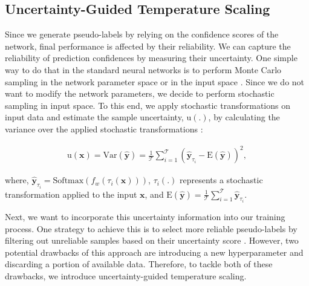 \documentclass[runningheads]{eccv2022submission}
\begin{document}
\subsection{Uncertainty-Guided Temperature Scaling}
\label{sec:uncr-temp}
Since we generate pseudo-labels by relying on the confidence scores of the network, final performance is affected by their reliability. We can capture the reliability of prediction confidences by measuring their uncertainty. One simple way to do that in the standard neural networks is to perform Monte Carlo sampling in the network parameter space \cite{gal2016dropout} or in the input space \cite{ayhan2018,rizve2021in}. Since we do not want to modify the network parameters, we decide to perform stochastic sampling in input space. To this end, we apply stochastic transformations on input data  and estimate the sample uncertainty, $\mathrm{u}(.)$, by calculating the variance over the applied stochastic transformations \cite{feinman2017detecting,NEURIPS2020_f23d125d,rizve2021in}:


\setlength{\abovedisplayskip}{-6pt}
\setlength{\belowdisplayskip}{2pt}
\setlength{\abovedisplayshortskip}{0pt}
\setlength{\belowdisplayshortskip}{0pt}

\begin{align}
\label{eqn:var}
    \mathrm{u}({\mathbf{x}})=\mathrm{Var}(\mathbf{\hat{y}}) = \frac{1}{\mathcal{T}}\sum_{i=1}^\mathcal{T}(\mathbf{\hat{y}}_{\tau_i}-\mathrm{E}(\mathbf{\hat{y}}))^2,
\end{align}

\noindent where, $\mathbf{\hat{y}}_{\tau_i} = \mathrm{Softmax}(f_w(\tau_i(\mathbf{x})))$, $\tau_i(.)$ represents a stochastic transformation applied to the input $\mathbf{x}$, and $\mathrm{E}(\mathbf{\hat{y}})=\frac{1}{\mathcal{T}}\sum_{i=1}^\mathcal{T}\mathbf{\hat{y}}_{\tau_i}$.


Next, we want to incorporate this uncertainty information into our training process. One strategy to achieve this is to select more reliable pseudo-labels by filtering out unreliable samples based on their uncertainty score \cite{rizve2021in}. However, two potential drawbacks of this approach are introducing a new hyperparameter and discarding a portion of available data. Therefore, to tackle both of these drawbacks, we introduce uncertainty-guided temperature scaling.   
\end{document}

